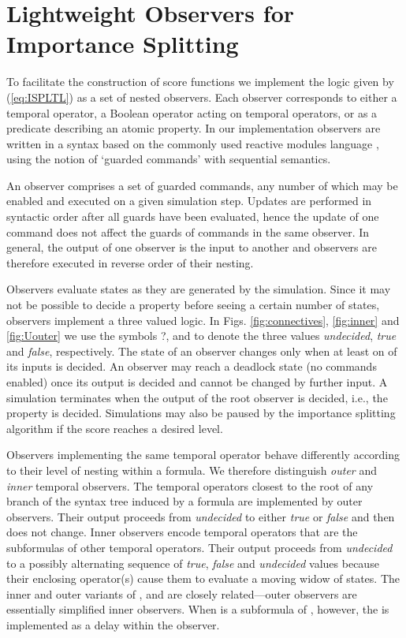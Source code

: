 \documentclass{llncs}
\begin{document}
\section{Lightweight Observers for Importance Splitting\label{sec:observers}}

To facilitate the construction of score functions we implement the
logic given by (\ref{eq:ISPLTL}) as a set of nested observers. Each
observer corresponds to either a temporal operator, a Boolean operator
acting on temporal operators, or as a predicate describing an atomic
property. In our implementation observers are written in a syntax
based on the commonly used reactive modules language \cite{AlurHenzinger1999},
using the notion of `guarded commands' \cite{Dijkstra1975} with
sequential semantics.

An observer comprises a set of guarded commands, any number of which
may be enabled and executed on a given simulation step. Updates are
performed in syntactic order after all guards have been evaluated,
hence the update of one command does not affect the guards of commands
in the same observer. In general, the output of one observer is the
input to another and observers are therefore executed in reverse order
of their nesting.

Observers evaluate states as they are generated by the simulation.
Since it may not be possible to decide a property before seeing a
certain number of states, observers implement a three valued logic.
In Figs. \ref{fig:connectives}, \ref{fig:inner} and \ref{fig:Uouter}
we use the symbols \textsf{?},  and  to denote the three
values \emph{undecided}, \emph{true} and \emph{false}, respectively.
The state of an observer changes only when at least on of its inputs
is decided. An observer may reach a deadlock state (no commands enabled)
once its output is decided and cannot be changed by further input.
A simulation terminates when the output of the root observer is decided,
i.e., the property is decided. Simulations may also be paused by the
importance splitting algorithm if the score reaches a desired level.

Observers implementing the same temporal operator behave differently
according to their level of nesting within a formula. We therefore
distinguish \emph{outer} and \emph{inner} temporal observers. The
temporal operators closest to the root of any branch of the syntax
tree induced by a formula are implemented by outer observers. Their
output proceeds from \emph{undecided} to either \emph{true} or \emph{false}
and then does not change. Inner observers encode temporal operators
that are the subformulas of other temporal operators. Their output
proceeds from \emph{undecided} to a possibly alternating sequence
of \emph{true}, \emph{false} and \emph{undecided} values because their
enclosing operator(s) cause them to evaluate a moving widow of states.
The inner and outer variants of ,  and 
are closely related---outer observers are essentially simplified inner
observers. When  is a subformula of , however,
the  is implemented as a delay within the 
observer.
\end{document}
